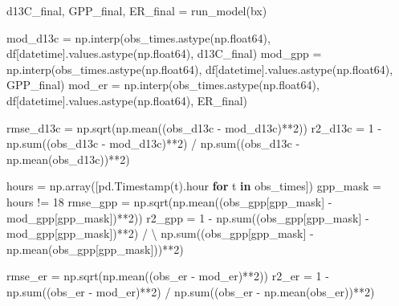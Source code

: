\documentclass[
  letterpaper,
  DIV=11,
  numbers=noendperiod]{scrartcl}
\newenvironment{Shaded}{\begin{snugshade}}{\end{snugshade}}
\newcommand{\BuiltInTok}[1]{\textcolor[rgb]{0.00,0.23,0.31}{#1}}
\newcommand{\ControlFlowTok}[1]{\textcolor[rgb]{0.00,0.23,0.31}{\textbf{#1}}}
\newcommand{\DecValTok}[1]{\textcolor[rgb]{0.68,0.00,0.00}{#1}}
\newcommand{\KeywordTok}[1]{\textcolor[rgb]{0.00,0.23,0.31}{\textbf{#1}}}
\newcommand{\NormalTok}[1]{\textcolor[rgb]{0.00,0.23,0.31}{#1}}
\newcommand{\OperatorTok}[1]{\textcolor[rgb]{0.37,0.37,0.37}{#1}}
\newcommand{\StringTok}[1]{\textcolor[rgb]{0.13,0.47,0.30}{#1}}
\begin{document}
\begin{Shaded}
\begin{Highlighting}[]
\NormalTok{d13C\_final, GPP\_final, ER\_final }\OperatorTok{=}\NormalTok{ run\_model(bx)}

\NormalTok{mod\_d13c }\OperatorTok{=}\NormalTok{ np.interp(obs\_times.astype(np.float64),}
\NormalTok{                     df[}\StringTok{\textquotesingle{}datetime\textquotesingle{}}\NormalTok{].values.astype(np.float64), d13C\_final)}
\NormalTok{mod\_gpp  }\OperatorTok{=}\NormalTok{ np.interp(obs\_times.astype(np.float64),}
\NormalTok{                     df[}\StringTok{\textquotesingle{}datetime\textquotesingle{}}\NormalTok{].values.astype(np.float64), GPP\_final)}
\NormalTok{mod\_er   }\OperatorTok{=}\NormalTok{ np.interp(obs\_times.astype(np.float64),}
\NormalTok{                     df[}\StringTok{\textquotesingle{}datetime\textquotesingle{}}\NormalTok{].values.astype(np.float64), ER\_final)}

\NormalTok{rmse\_d13c }\OperatorTok{=}\NormalTok{ np.sqrt(np.mean((obs\_d13c }\OperatorTok{{-}}\NormalTok{ mod\_d13c)}\OperatorTok{**}\DecValTok{2}\NormalTok{))}
\NormalTok{r2\_d13c   }\OperatorTok{=} \DecValTok{1} \OperatorTok{{-}}\NormalTok{ np.}\BuiltInTok{sum}\NormalTok{((obs\_d13c }\OperatorTok{{-}}\NormalTok{ mod\_d13c)}\OperatorTok{**}\DecValTok{2}\NormalTok{) }\OperatorTok{/}\NormalTok{ np.}\BuiltInTok{sum}\NormalTok{((obs\_d13c }\OperatorTok{{-}}\NormalTok{ np.mean(obs\_d13c))}\OperatorTok{**}\DecValTok{2}\NormalTok{)}

\NormalTok{hours    }\OperatorTok{=}\NormalTok{ np.array([pd.Timestamp(t).hour }\ControlFlowTok{for}\NormalTok{ t }\KeywordTok{in}\NormalTok{ obs\_times])}
\NormalTok{gpp\_mask }\OperatorTok{=}\NormalTok{ hours }\OperatorTok{!=} \DecValTok{18}
\NormalTok{rmse\_gpp }\OperatorTok{=}\NormalTok{ np.sqrt(np.mean((obs\_gpp[gpp\_mask] }\OperatorTok{{-}}\NormalTok{ mod\_gpp[gpp\_mask])}\OperatorTok{**}\DecValTok{2}\NormalTok{))}
\NormalTok{r2\_gpp   }\OperatorTok{=} \DecValTok{1} \OperatorTok{{-}}\NormalTok{ np.}\BuiltInTok{sum}\NormalTok{((obs\_gpp[gpp\_mask] }\OperatorTok{{-}}\NormalTok{ mod\_gpp[gpp\_mask])}\OperatorTok{**}\DecValTok{2}\NormalTok{) }\OperatorTok{/} \OperatorTok{\textbackslash{}}
\NormalTok{               np.}\BuiltInTok{sum}\NormalTok{((obs\_gpp[gpp\_mask] }\OperatorTok{{-}}\NormalTok{ np.mean(obs\_gpp[gpp\_mask]))}\OperatorTok{**}\DecValTok{2}\NormalTok{)}

\NormalTok{rmse\_er  }\OperatorTok{=}\NormalTok{ np.sqrt(np.mean((obs\_er }\OperatorTok{{-}}\NormalTok{ mod\_er)}\OperatorTok{**}\DecValTok{2}\NormalTok{))}
\NormalTok{r2\_er    }\OperatorTok{=} \DecValTok{1} \OperatorTok{{-}}\NormalTok{ np.}\BuiltInTok{sum}\NormalTok{((obs\_er }\OperatorTok{{-}}\NormalTok{ mod\_er)}\OperatorTok{**}\DecValTok{2}\NormalTok{) }\OperatorTok{/}\NormalTok{ np.}\BuiltInTok{sum}\NormalTok{((obs\_er }\OperatorTok{{-}}\NormalTok{ np.mean(obs\_er))}\OperatorTok{**}\DecValTok{2}\NormalTok{)}


\end{Highlighting}
\end{Shaded}
\end{document}
